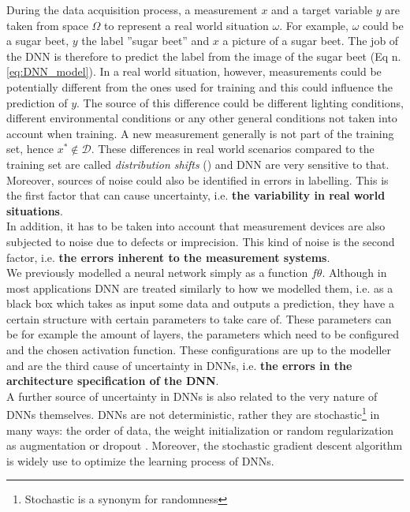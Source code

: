 During the data acquisition process, a measurement $x$ and a target variable $y$ are taken from space $\Omega$ to  represent a real world situation $\omega$. For example, $\omega$ could be a sugar beet, $y$ the label ''sugar beet'' and $x$ a picture of a sugar beet. The job of the DNN is therefore to predict the label from the image of the sugar beet (Eq n. \ref{eq:DNN_model}). In a real world situation, however, measurements could be potentially different from the ones used for training and this could influence the prediction of $y$. The source of this difference could be different lighting conditions, different environmental conditions or any other general conditions not taken into account when training. A new measurement generally is not part of the training set, hence $x^* \notin \mathcal{D}$. These differences in real world scenarios compared to the training set are called \textit{distribution shifts} (\cite{ovadia2019trust}) and DNN are very sensitive to that. Moreover, sources of noise could also be identified in errors in labelling. This is the first factor that can cause uncertainty, i.e. \textbf{the variability in real world situations}. \cite{gawlikowski2021survey}\\
In addition, it has to be taken into account that measurement devices are also subjected to noise due to defects or imprecision. This kind of noise is the second factor, i.e. \textbf{the errors inherent to the measurement systems}. \cite{gawlikowski2021survey}\\
We previously modelled a neural network simply as a function $f\theta$. Although in most applications DNN are treated similarly to how we modelled them, i.e. as a black box which takes as input some data and outputs a prediction, they have a certain structure with certain parameters to take care of. These parameters can be for example the amount of layers, the parameters which need to be configured and the chosen activation function. These configurations are up to the modeller and are the third cause of uncertainty in DNNs, i.e. \textbf{the errors in the architecture specification of the DNN}. \cite{gawlikowski2021survey}\\
A further source of uncertainty in DNNs is also related to the very nature of DNNs themselves. DNNs are not deterministic, rather they are stochastic\footnote{Stochastic is a synonym for randomness} in many ways: the order of data, the weight initialization or random regularization as augmentation or dropout \cite{gawlikowski2021survey}. Moreover, the stochastic gradient descent algorithm is widely use to optimize the learning process of DNNs. \cite{ruder2017overview}\\
